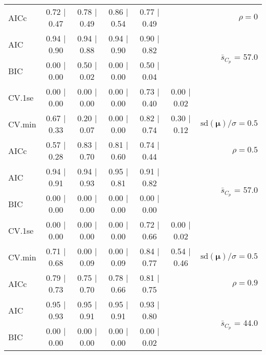 \documentclass[12pt]{article}
\newcommand{\mr}[1]{\mathrm{#1}}
\newcommand{\bm}[1]{\mathbf{#1}}
\begin{document}
\begin{table}[p]
\begin{center}
\begin{tabular}{l*{5}{c}|r}
AICc & 0.72 $\mid$ 0.47 & 0.78 $\mid$ 0.49 & 0.86 $\mid$ 0.54 & 0.77 $\mid$ 0.49 & & $\rho=0$ \\
AIC & 0.94 $\mid$ 0.90 & 0.94 $\mid$ 0.88 & 0.94 $\mid$ 0.90 & 0.90 $\mid$ 0.82 & & \multirow{2}{*}{$\bar{s}_{C_p}$ = 57.0} \\
BIC & 0.00 $\mid$ 0.00 & 0.50 $\mid$ 0.02 & 0.00 $\mid$ 0.00 & 0.50 $\mid$ 0.04 & & \\
 \hline 
CV.1se & 0.00 $\mid$ 0.00 & 0.00 $\mid$ 0.00 & 0.00 $\mid$ 0.00 & 0.73 $\mid$ 0.40 & 0.00 $\mid$ 0.02 &\\
CV.min & 0.67 $\mid$ 0.33 & 0.20 $\mid$ 0.07 & 0.00 $\mid$ 0.00 & 0.82 $\mid$ 0.74 & 0.30 $\mid$ 0.12 &  $\mr{sd}(\bm{\mu})/\sigma=0.5$ \\
AICc & 0.57 $\mid$ 0.28 & 0.83 $\mid$ 0.70 & 0.81 $\mid$ 0.60 & 0.74 $\mid$ 0.44 & & $\rho=0.5$ \\
AIC & 0.94 $\mid$ 0.91 & 0.94 $\mid$ 0.93 & 0.95 $\mid$ 0.81 & 0.91 $\mid$ 0.82 & & \multirow{2}{*}{$\bar{s}_{C_p}$ = 57.0} \\
BIC & 0.00 $\mid$ 0.00 & 0.00 $\mid$ 0.00 & 0.00 $\mid$ 0.00 & 0.00 $\mid$ 0.00 & & \\
 \hline 
CV.1se & 0.00 $\mid$ 0.00 & 0.00 $\mid$ 0.00 & 0.00 $\mid$ 0.00 & 0.72 $\mid$ 0.66 & 0.00 $\mid$ 0.02 &\\
CV.min & 0.71 $\mid$ 0.68 & 0.00 $\mid$ 0.09 & 0.00 $\mid$ 0.09 & 0.84 $\mid$ 0.77 & 0.54 $\mid$ 0.46 &  $\mr{sd}(\bm{\mu})/\sigma=0.5$ \\
AICc & 0.79 $\mid$ 0.73 & 0.75 $\mid$ 0.70 & 0.78 $\mid$ 0.66 & 0.81 $\mid$ 0.75 & & $\rho=0.9$ \\
AIC & 0.95 $\mid$ 0.93 & 0.95 $\mid$ 0.91 & 0.95 $\mid$ 0.91 & 0.93 $\mid$ 0.80 & & \multirow{2}{*}{$\bar{s}_{C_p}$ = 44.0} \\
BIC & 0.00 $\mid$ 0.00 & 0.00 $\mid$ 0.00 & 0.00 $\mid$ 0.00 & 0.00 $\mid$ 0.02 & & \\
 \hline 
 \end{tabular}
\end{center}
\vspace{-1cm}
\end{table}
\end{document}
